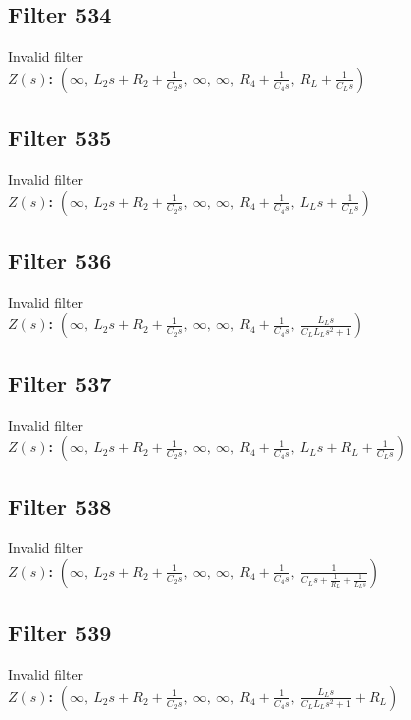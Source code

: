 \documentclass{article}
\begin{document}
\subsection*{Filter 534}
Invalid filter \\ 
\textbf{$Z(s)$:} $\left( \infty, \  L_{2} s + R_{2} + \frac{1}{C_{2} s}, \  \infty, \  \infty, \  R_{4} + \frac{1}{C_{4} s}, \  R_{L} + \frac{1}{C_{L} s}\right)$ \\ 
\subsection*{Filter 535}
Invalid filter \\ 
\textbf{$Z(s)$:} $\left( \infty, \  L_{2} s + R_{2} + \frac{1}{C_{2} s}, \  \infty, \  \infty, \  R_{4} + \frac{1}{C_{4} s}, \  L_{L} s + \frac{1}{C_{L} s}\right)$ \\ 
\subsection*{Filter 536}
Invalid filter \\ 
\textbf{$Z(s)$:} $\left( \infty, \  L_{2} s + R_{2} + \frac{1}{C_{2} s}, \  \infty, \  \infty, \  R_{4} + \frac{1}{C_{4} s}, \  \frac{L_{L} s}{C_{L} L_{L} s^{2} + 1}\right)$ \\ 
\subsection*{Filter 537}
Invalid filter \\ 
\textbf{$Z(s)$:} $\left( \infty, \  L_{2} s + R_{2} + \frac{1}{C_{2} s}, \  \infty, \  \infty, \  R_{4} + \frac{1}{C_{4} s}, \  L_{L} s + R_{L} + \frac{1}{C_{L} s}\right)$ \\ 
\subsection*{Filter 538}
Invalid filter \\ 
\textbf{$Z(s)$:} $\left( \infty, \  L_{2} s + R_{2} + \frac{1}{C_{2} s}, \  \infty, \  \infty, \  R_{4} + \frac{1}{C_{4} s}, \  \frac{1}{C_{L} s + \frac{1}{R_{L}} + \frac{1}{L_{L} s}}\right)$ \\ 
\subsection*{Filter 539}
Invalid filter \\ 
\textbf{$Z(s)$:} $\left( \infty, \  L_{2} s + R_{2} + \frac{1}{C_{2} s}, \  \infty, \  \infty, \  R_{4} + \frac{1}{C_{4} s}, \  \frac{L_{L} s}{C_{L} L_{L} s^{2} + 1} + R_{L}\right)$ \\ 
\end{document}
